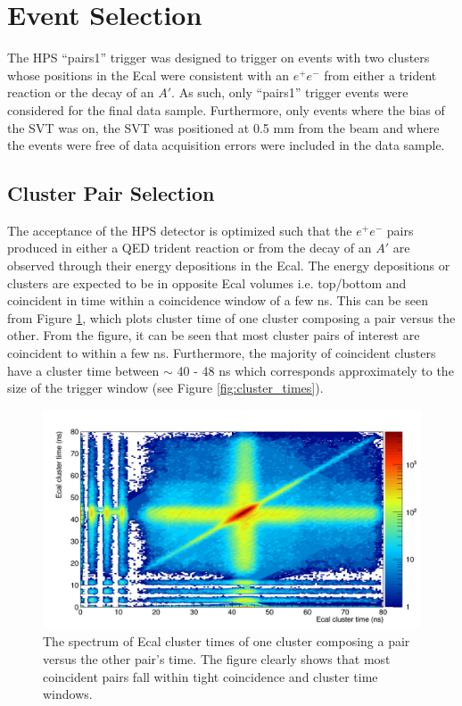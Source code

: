 \section{Event Selection}

The HPS ``pairs1'' trigger was designed to trigger on events with two clusters
whose positions in the Ecal were consistent with an $e^+e^-$ from either a trident 
reaction or the decay of an $A'$. As such, only ``pairs1'' trigger events
were considered for the final data sample.  Furthermore, only events where the
bias of the SVT was on, the SVT was positioned at 0.5 mm from the beam and 
where the events were free of data acquisition errors were included in the data sample.

\subsection{Cluster Pair Selection}

The acceptance of the HPS detector is optimized such that the $e^+e^-$ pairs
produced in either a QED trident reaction or from the decay of an 
$A'$ are observed through their energy depositions in the Ecal.  The energy
depositions or clusters are expected to be in opposite Ecal volumes i.e. 
top/bottom and coincident in time within a coincidence window of a few ns.  This
can be seen from Figure \ref{fig:cluster_times_2d}, which plots  
cluster time of one cluster composing a pair versus the 
other.  From the figure, it can be seen that most cluster pairs of interest are 
coincident to within a few ns. Furthermore, the majority of coincident clusters
have a cluster time between $\sim$ 40 - 48 ns which corresponds approximately
to the size of the trigger window (see Figure \ref{fig:cluster_times}). 
\begin{figure}[t]
    \centering
    \includegraphics[width=\textwidth]{images/20160428_pass4_cluster_time_v_cluster_time.png}
    \caption{The spectrum of Ecal cluster times of one cluster composing a pair 
             versus the other pair's time.  The figure clearly shows that most coincident pairs 
             fall within tight coincidence and cluster time windows.}
    \label{fig:cluster_times_2d}
\end{figure}  

